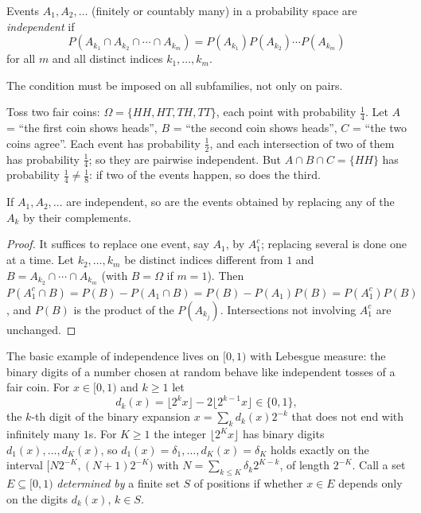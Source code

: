 \begin{definition}\label{measure-theory:definition-independent}
Events $A_1, A_2, \ldots$ (finitely or countably many) in a probability space are \emph{independent} if
\[
P(A_{k_1} \cap A_{k_2} \cap \cdots \cap A_{k_m}) = P(A_{k_1})P(A_{k_2}) \cdots P(A_{k_m})
\]
for all $m$ and all distinct indices $k_1, \ldots, k_m$.
\end{definition}

The condition must be imposed on all subfamilies, not only on pairs.

\begin{example}\label{measure-theory:example-pairwise-independent}
Toss two fair coins: $\Omega = \{HH, HT, TH, TT\}$, each point with probability $\frac14$. Let $A$ = ``the first coin shows heads'', $B$ = ``the second coin shows heads'', $C$ = ``the two coins agree''. Each
event has probability $\frac12$, and each intersection of two of them has probability $\frac14$; so they are pairwise independent. But $A \cap B \cap C = \{HH\}$ has probability $\frac14 \neq \frac18$: if
two of the events happen, so does the third.
\end{example}

\begin{lemma}\label{measure-theory:lemma-independent-complements}
If $A_1, A_2, \ldots$ are independent, so are the events obtained by replacing any of the $A_k$ by their complements.
\end{lemma}

\begin{proof}
It suffices to replace one event, say $A_1$, by $A_1^c$; replacing several is done one at a time. Let $k_2, \ldots, k_m$ be distinct indices different from $1$ and $B = A_{k_2} \cap \cdots \cap A_{k_m}$ (with
$B = \Omega$ if $m = 1$). Then $P(A_1^c \cap B) = P(B) - P(A_1 \cap B) = P(B) - P(A_1)P(B) = P(A_1^c)P(B)$, and $P(B)$ is the product of the $P(A_{k_j})$. Intersections not involving $A_1^c$ are unchanged.
\end{proof}

The basic example of independence lives on $[0, 1)$ with Lebesgue measure: the binary digits of a number chosen at random behave like independent tosses of a fair coin. For $x \in [0, 1)$ and $k \geq 1$ let
\[
d_k(x) = \lfloor 2^kx\rfloor - 2\lfloor 2^{k-1}x\rfloor \in \{0, 1\},
\]
the $k$-th digit of the binary expansion $x = \sum_kd_k(x)2^{-k}$ that does not end with infinitely many $1$s. For $K \geq 1$ the integer $\lfloor 2^Kx\rfloor$ has binary digits $d_1(x), \ldots, d_K(x)$, so
$d_1(x) = \delta_1, \ldots, d_K(x) = \delta_K$ holds exactly on the interval $[N2^{-K}, (N + 1)2^{-K})$ with $N = \sum_{k \leq K}\delta_k2^{K-k}$, of length $2^{-K}$. Call a set $E \subseteq [0, 1)$
\emph{determined by} a finite set $S$ of positions if whether $x \in E$ depends only on the digits $d_k(x)$, $k \in S$.

